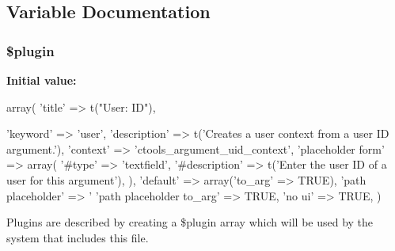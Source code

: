 \subsection{Variable Documentation}
\hypertarget{uid_8inc_ada8a7130088351710bb02ed622d6bf65}{
\subsubsection[{\$plugin}]{\setlength{\rightskip}{0pt plus 5cm}\$plugin}}
\label{uid_8inc_ada8a7130088351710bb02ed622d6bf65}
{\bfseries Initial value:}
\begin{DoxyCode}
 array(
  'title' => t("User: ID"),
  
  'keyword' => 'user',
  'description' => t('Creates a user context from a user ID argument.'),
  'context' => 'ctools_argument_uid_context',
  'placeholder form' => array(
    '#type' => 'textfield',
    '#description' => t('Enter the user ID of a user for this argument'),
  ),
  'default' => array('to_arg' => TRUE),
  'path placeholder' => '%
  'path placeholder to_arg' => TRUE,
  'no ui' => TRUE,
)
\end{DoxyCode}
Plugins are described by creating a \$plugin array which will be used by the system that includes this file. 